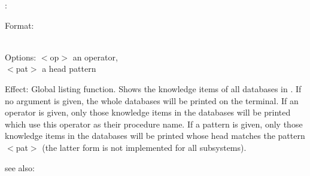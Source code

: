 \colab{} \listing:

Format: \\
        \\

Options: $<$op$>$ an operator,\\
         $<$pat$>$ a head pattern

Effect: Global listing function. Shows the knowledge items of all 
        databases in \COLAB. If no argument is given, the whole 
        databases will be printed on the terminal. If an operator 
        is given, only those knowledge items in the databases will 
        be printed which use this operator as their procedure name. 
        If a pattern is given, only those knowledge items in the 
        databases will be printed whose head matches the pattern 
        $<$pat$>$ (the latter form is not implemented for all 
        subsystems).

see also: \consult
